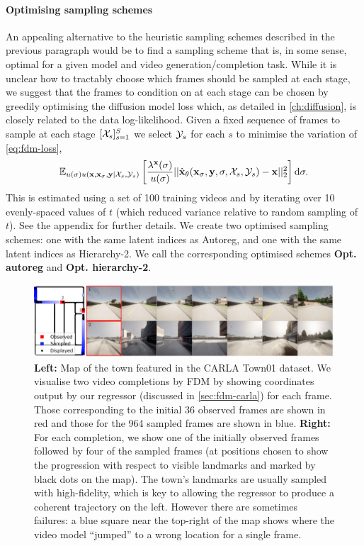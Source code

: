 \paragraph{Optimising sampling schemes}
An appealing alternative to the heuristic sampling schemes described in the previous paragraph would be to find a sampling scheme that is, in some sense, optimal for a given model and video generation/completion task. While it is unclear how to tractably choose which frames should be sampled at each stage, we suggest that the frames to condition on at each stage can be chosen by greedily optimising the diffusion model loss which, as detailed in \cref{ch:diffusion}, is closely related to the data log-likelihood. Given a fixed sequence of frames to sample at each stage $[\mathcal{X}_s]_{s=1}^S$ we select $\mathcal{Y}_s$ for each $s$ to minimise the variation of \cref{eq:fdm-loss},
\begin{align}
    \mathbb{E}_{u(\sigma)u({\mathbf{x}}, {\mathbf{x}}_\sigma, {\mathbf{y}}|{\mathcal{X}}_s, {\mathcal{Y}}_s)} \left[
    \frac{\lambda^{\mathbf{x}}(\sigma)}{u(\sigma)}
    || \hat{{\mathbf{x}}}_\theta({\mathbf{x}}_\sigma, {\mathbf{y}}, \sigma, {\mathcal{X}}_s, {\mathcal{Y}}_s) - {\mathbf{x}} ||_2^2 \right] \mathrm{d}\sigma.
\end{align}
This is estimated using a set of 100 training videos and by iterating over 10 evenly-spaced values of $t$ (which reduced variance relative to random sampling of $t$). See the appendix for further details. We create two optimised sampling schemes: one with the same latent indices as Autoreg, and one with the same latent indices as Hierarchy-2. We call the corresponding optimised schemes \textbf{Opt. autoreg} and \textbf{Opt. hierarchy-2}.


\begin{figure}
    \centering
    \includegraphics[width=1\textwidth]{figs/fdm/carla_map_7panel}
    \caption{\textbf{Left:} Map of the town featured in the CARLA Town01 dataset. We visualise two video completions by FDM by showing coordinates output by our regressor (discussed in \cref{sec:fdm-carla}) for each frame. Those corresponding to the initial 36 observed frames are shown in red and those for the 964 sampled frames are shown in blue. \textbf{Right:} For each completion, we show one of the initially observed frames followed by four of the sampled frames (at positions chosen to show the progression with respect to visible landmarks and marked by black dots on the map). The town's landmarks are usually sampled with high-fidelity, which is key to allowing the regressor  to produce a coherent trajectory on the left. However there are sometimes failures: a blue square near the top-right of the map shows where the video model ``jumped'' to a wrong location for a single frame.}
    \label{fig:carla}
\end{figure}


